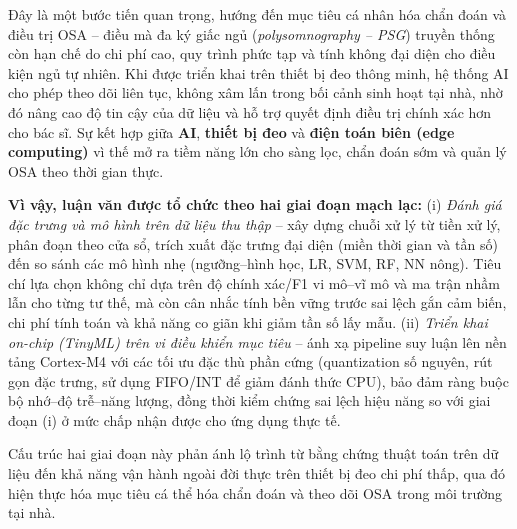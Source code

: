 Đây là một bước tiến quan trọng, hướng đến mục tiêu cá nhân hóa chẩn đoán và điều trị OSA – điều mà đa ký giấc ngủ (\textit{polysomnography – PSG}) truyền thống còn hạn chế do chi phí cao, quy trình phức tạp và tính không đại diện cho điều kiện ngủ tự nhiên. Khi được triển khai trên thiết bị đeo thông minh, hệ thống AI cho phép theo dõi liên tục, không xâm lấn trong bối cảnh sinh hoạt tại nhà, nhờ đó nâng cao độ tin cậy của dữ liệu và hỗ trợ quyết định điều trị chính xác hơn cho bác sĩ. Sự kết hợp giữa \textbf{AI}, \textbf{thiết bị đeo} và \textbf{điện toán biên (edge computing)} vì thế mở ra tiềm năng lớn cho sàng lọc, chẩn đoán sớm và quản lý OSA theo thời gian thực.

\noindent\textbf{Vì vậy, luận văn được tổ chức theo hai giai đoạn mạch lạc:}
(i) \emph{Đánh giá đặc trưng và mô hình trên dữ liệu thu thập} – xây dựng chuỗi xử lý từ tiền xử lý, phân đoạn theo cửa sổ, trích xuất đặc trưng đại diện (miền thời gian và tần số) đến so sánh các mô hình nhẹ (ngưỡng–hình học, LR, SVM, RF, NN nông). Tiêu chí lựa chọn không chỉ dựa trên độ chính xác/F1 vi mô–vĩ mô và ma trận nhầm lẫn cho từng tư thế, mà còn cân nhắc tính bền vững trước sai lệch gắn cảm biến, chi phí tính toán và khả năng co giãn khi giảm tần số lấy mẫu.
(ii) \emph{Triển khai on-chip (TinyML) trên vi điều khiển mục tiêu} – ánh xạ pipeline suy luận lên nền tảng Cortex-M4 với các tối ưu đặc thù phần cứng (quantization số nguyên, rút gọn đặc trưng, sử dụng FIFO/INT để giảm đánh thức CPU), bảo đảm ràng buộc bộ nhớ–độ trễ–năng lượng, đồng thời kiểm chứng sai lệch hiệu năng so với giai đoạn (i) ở mức chấp nhận được cho ứng dụng thực tế.

Cấu trúc hai giai đoạn này phản ánh lộ trình từ bằng chứng thuật toán trên dữ
liệu đến khả năng vận hành ngoài đời thực trên thiết bị đeo chi phí thấp, qua
đó hiện thực hóa mục tiêu cá thể hóa chẩn đoán và theo dõi OSA trong môi trường
tại nhà.

